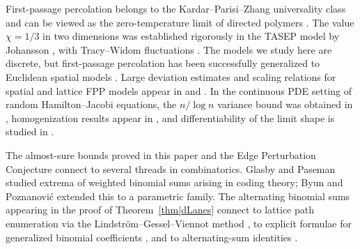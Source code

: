 \documentclass[reqno]{amsart}
\def\ConjectureName{Edge Perturbation Conjecture}
\begin{document}
First-passage percolation belongs to the Kardar--Parisi--Zhang
universality class \cite{AlbertsKhaninQuastel2014,CorwinGhosalHammond2021}
and can be viewed as the zero-temperature limit of directed polymers
\cite{Zygouras2024}. The value $\chi=1/3$ in two dimensions was
established rigorously in the TASEP model by Johansson
\cite{Johansson2000}, with Tracy--Widom fluctuations
\cite{TracyWidom1994}. The models we study here are discrete, but first-passage percolation has been successfully generalized to Euclidean spatial models \cite{HowardNewman1997}. Large deviation estimates and scaling relations for spatial and lattice FPP models appear in \cite{BasuGangulySly2021} and \cite{BasuSidoraviciusSly2023}. In the continuous PDE setting of
random Hamilton--Jacobi equations, the $n/\log n$ variance bound was
obtained in \cite{MaticNolen2012}, homogenization results appear in
\cite{RezakhanlouTarver2000,ArmstrongCardaliaguetSouganidis2014,
DaviniKosyginaYilmaz2023}, and differentiability of the limit shape
is studied in \cite{BakhtinDow2024}.

The almost-sure bounds proved in this paper and the \ConjectureName{}
connect to several threads in combinatorics. Glasby and Paseman
\cite{GlasbyPaseman2022,GlasbyPaseman2024} studied extrema of weighted
binomial sums arising in coding theory; Byun and Poznanovi\'{c}
\cite{ByunPoznanovic2024} extended this to a parametric family. The
alternating binomial sums appearing in the proof of
Theorem~\ref{thm|dLanes} connect to lattice path enumeration via the
Lindstr\"{o}m--Gessel--Viennot method
\cite{Fulmek2012,Krattenthaler2010,Lee2022}, to explicit formulae for
generalized binomial coefficients \cite{Petrov2016}, and to
alternating-sum identities \cite{GuoJouhetZeng2007,ElBachraoui2021}.
   
 
 
 
 
 
    
 
\end{document}
